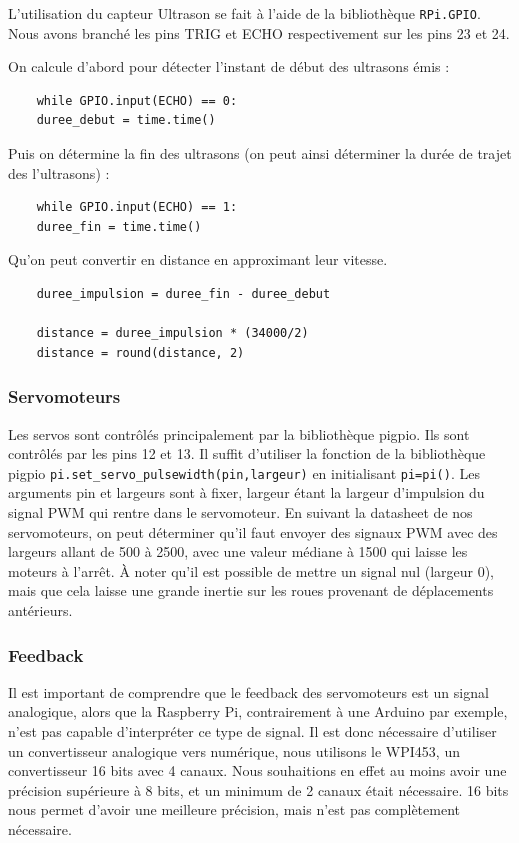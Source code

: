 \documentclass[a4paper,12pt]{report}  %
\begin{document}
L’utilisation du capteur Ultrason se fait à l’aide de la bibliothèque \texttt{RPi.GPIO}.
Nous avons branché les pins TRIG et ECHO respectivement sur les pins 23 et 24.

On calcule d’abord pour détecter l’instant de début des ultrasons émis :
\begin{lstlisting}
	while GPIO.input(ECHO) == 0:   
	duree_debut = time.time()
\end{lstlisting}

Puis on détermine la fin des ultrasons (on peut ainsi déterminer la durée de trajet des l’ultrasons) :
\begin{lstlisting}
	while GPIO.input(ECHO) == 1:
	duree_fin = time.time()
\end{lstlisting}

Qu’on peut convertir en distance en approximant leur vitesse.

\begin{lstlisting}
	duree_impulsion = duree_fin - duree_debut
	
	distance = duree_impulsion * (34000/2)
	distance = round(distance, 2)
\end{lstlisting}

\subsubsection{Servomoteurs}

Les servos sont contrôlés principalement par la bibliothèque pigpio.  
Ils sont contrôlés par les pins 12 et 13. Il suffit d’utiliser la fonction de la bibliothèque pigpio \texttt{pi.set\_servo\_pulsewidth(pin,largeur)} en initialisant \texttt{pi=pi()}. Les arguments pin et largeurs sont à fixer, largeur étant la largeur d’impulsion du signal PWM qui rentre dans le servomoteur. En suivant la datasheet de nos servomoteurs, on peut déterminer qu’il faut envoyer des signaux PWM avec des largeurs allant de 500 à 2500, avec une valeur médiane à 1500 qui laisse les moteurs à l’arrêt.
À noter qu’il est possible de mettre un signal nul (largeur 0), mais que cela laisse une grande inertie sur les roues provenant de déplacements antérieurs. 

\subsubsection{Feedback}

Il est important de comprendre que le feedback des servomoteurs est un signal analogique, alors que la Raspberry Pi, contrairement à une Arduino par exemple, n’est pas capable d’interpréter ce type de signal. Il est donc nécessaire d’utiliser un convertisseur analogique vers numérique, nous utilisons le WPI453, un convertisseur 16 bits avec 4 canaux. Nous souhaitions en effet au moins avoir une précision supérieure à 8 bits, et un minimum de 2 canaux était nécessaire. 16 bits nous permet d’avoir une meilleure précision, mais n’est pas complètement nécessaire.
\end{document}
